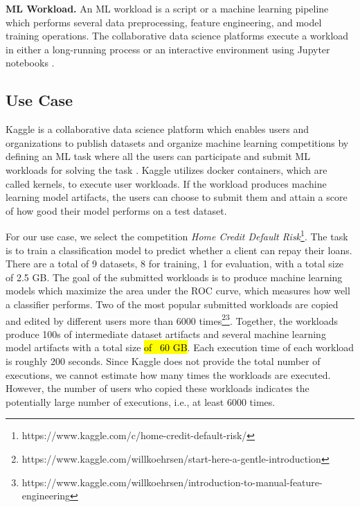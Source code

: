 \textbf{ML Workload.}
An ML workload is a script or a machine learning pipeline which performs several data preprocessing, feature engineering, and model training operations. 
The collaborative data science platforms execute a workload in either a long-running process or an interactive environment using Jupyter notebooks \cite{Kluyver:2016aa}.

\subsection{Use Case}\label{subsec-motivational-example}
Kaggle is a collaborative data science platform which enables users and organizations to publish datasets and organize machine learning competitions by defining an ML task where all the users can participate and submit ML workloads for solving the task \cite{kagglewebsite}.
Kaggle utilizes docker containers, which are called kernels, to execute user workloads.
If the workload produces machine learning model artifacts, the users can choose to submit them and attain a score of how good their model performs on a test dataset.

For our use case, we select the competition \textit{Home Credit Default Risk}\footnote{https://www.kaggle.com/c/home-credit-default-risk/}.
The task is to train a classification model to predict whether a client can repay their loans.
There are a total of 9 datasets, 8 for training, 1 for evaluation, with a total size of 2.5 GB.
The goal of the submitted workloads is to produce machine learning models which maximize the area under the ROC curve, which measures how well a classifier performs.
Two of the most popular submitted workloads are copied and edited by different users more than 6000 times\footnote{https://www.kaggle.com/willkoehrsen/start-here-a-gentle-introduction}\footnote{https://www.kaggle.com/willkoehrsen/introduction-to-manual-feature-engineering}.
Together, the workloads produce 100s of intermediate dataset artifacts and several machine learning model artifacts with a total size \hl{of ~60 GB}.
Each execution time of each workload is roughly 200 seconds.
Since Kaggle does not provide the total number of executions, we cannot estimate how many times the workloads are executed.
However, the number of users who copied these workloads indicates the potentially large number of executions, i.e., at least 6000 times.

